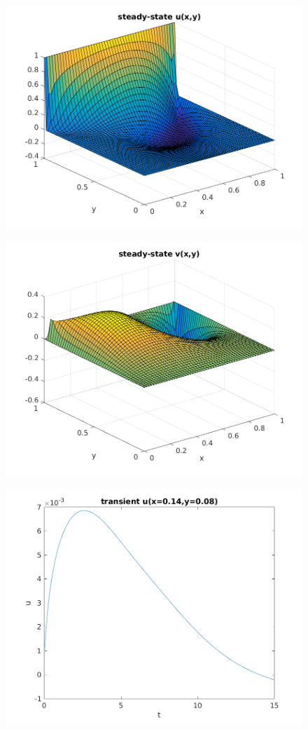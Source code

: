 \documentclass[12pt]{article}
\begin{document}
	\begin{figure}[!htb]
		\centering
		\includegraphics[scale=1]{surf_U.png}
	\end{figure}

	\begin{figure}[!htb]
		\centering
		\includegraphics[scale=1]{surf_V.png}
	\end{figure}

	\begin{figure}[!htb]
		\centering
		\includegraphics[scale=1]{U_trans.png}
	\end{figure}
	

		
\end{document}
